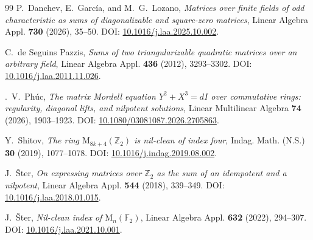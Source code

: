 \documentclass[12pt]{amsart}
\theoremstyle{remark}
\numberwithin{equation}{section}
\theoremstyle{definition}
\newcommand{\F}{\mathbb F}
\newcommand{\Mat}{\mathrm M}
\begin{document}
\begin{thebibliography}{99}
P.~Danchev, E.~Garc\'ia, and M.~G.~Lozano, \emph{Matrices over finite fields of odd characteristic as sums of diagonalizable and square-zero matrices}, Linear Algebra Appl. \textbf{730} (2026), 35--50.
DOI: \href{https://doi.org/10.1016/j.laa.2025.10.002}{10.1016/j.laa.2025.10.002}.

C.~de Seguins Pazzis, \emph{Sums of two triangularizable quadratic matrices over an arbitrary field}, Linear Algebra Appl. \textbf{436} (2012), 3293--3302.
DOI: \href{https://doi.org/10.1016/j.laa.2011.11.026}{10.1016/j.laa.2011.11.026}.

\DJ.~V.~Ph\'uc, \emph{The matrix Mordell equation $Y^2+X^3=dI$ over commutative rings: regularity, diagonal lifts, and nilpotent solutions}, Linear Multilinear Algebra \textbf{74} (2026), 1903--1923.
DOI: \href{https://doi.org/10.1080/03081087.2026.2705863}{10.1080/03081087.2026.2705863}.

Y.~Shitov, \emph{The ring $\Mat_{8k+4}(\mathbb Z_2)$ is nil-clean of index four}, Indag. Math. (N.S.) \textbf{30} (2019), 1077--1078.
DOI: \href{https://doi.org/10.1016/j.indag.2019.08.002}{10.1016/j.indag.2019.08.002}.

J.~\v{S}ter, \emph{On expressing matrices over $\mathbb Z_2$ as the sum of an idempotent and a nilpotent}, Linear Algebra Appl. \textbf{544} (2018), 339--349.
DOI: \href{https://doi.org/10.1016/j.laa.2018.01.015}{10.1016/j.laa.2018.01.015}.

J.~\v{S}ter, \emph{Nil-clean index of $\Mat_n(\F_2)$}, Linear Algebra Appl. \textbf{632} (2022), 294--307.
DOI: \href{https://doi.org/10.1016/j.laa.2021.10.001}{10.1016/j.laa.2021.10.001}.

\end{thebibliography}
\end{document}
